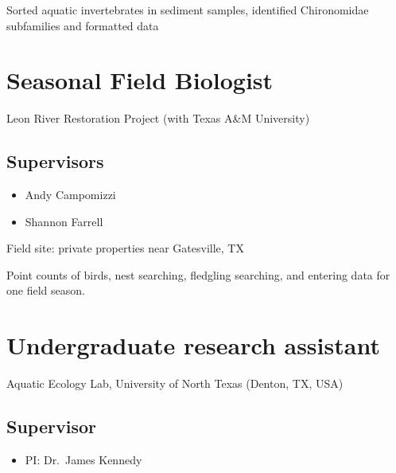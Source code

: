 \documentclass[
  letterpaper,
  DIV=11,
  numbers=noendperiod,
  oneside]{scrreprt}
\providecommand{\tightlist}{%
  \setlength{\itemsep}{0pt}\setlength{\parskip}{0pt}}\usepackage{longtable,booktabs,array}
\begin{document}
Sorted aquatic invertebrates in sediment samples, identified
Chironomidae subfamilies and formatted data

\section{Seasonal Field Biologist}\label{seasonal-field-biologist}

Leon River Restoration Project (with Texas A\&M University)


\subsection{Supervisors}\label{supervisors-2}

\begin{itemize}
\tightlist
\item
  Andy Campomizzi
\item
  Shannon Farrell
\end{itemize}

Field site: private properties near Gatesville, TX

Point counts of birds, nest searching, fledgling searching, and entering
data for one field season.

\section{Undergraduate research
assistant}\label{undergraduate-research-assistant-1}

Aquatic Ecology Lab, University of North Texas (Denton, TX, USA)


\subsection{Supervisor}\label{supervisor-4}

\begin{itemize}
\tightlist
\item
  PI: Dr.~James Kennedy
\end{itemize}
\end{document}
